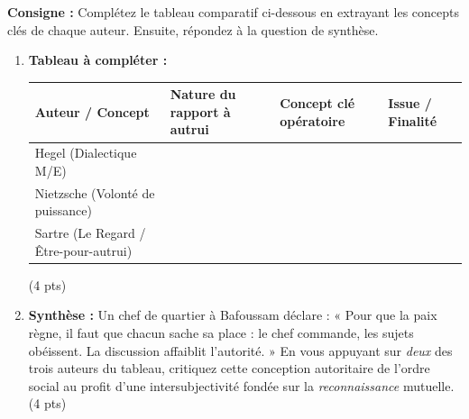 \documentclass[11pt]{article}
\begin{document}
\begin{exercice}
    \textbf{Consigne :} Complétez le tableau comparatif ci-dessous en extrayant les concepts clés de chaque auteur. Ensuite, répondez à la question de synthèse.
    \begin{enumerate}
        \item \textbf{Tableau à compléter :}
        \begin{tabularx}{\linewidth}{|X|X|X|X|}
            \hline
            \textbf{Auteur / Concept} & \textbf{Nature du rapport à autrui} & \textbf{Concept clé opératoire} & \textbf{Issue / Finalité} \\
            \hline
            Hegel (Dialectique M/E) & & & \\
            \hline
            Nietzsche (Volonté de puissance) & & & \\
            \hline
            Sartre (Le Regard / Être-pour-autrui) & & & \\
            \hline
        \end{tabularx}
        (4 pts)
        \item \textbf{Synthèse :} Un chef de quartier à Bafoussam déclare : « Pour que la paix règne, il faut que chacun sache sa place : le chef commande, les sujets obéissent. La discussion affaiblit l'autorité. » En vous appuyant sur \textit{deux} des trois auteurs du tableau, critiquez cette conception autoritaire de l'ordre social au profit d'une intersubjectivité fondée sur la \textit{reconnaissance} mutuelle. (4 pts)
    \end{enumerate}
\end{exercice}
\end{document}
